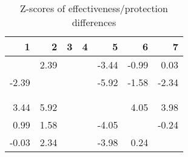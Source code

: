 \begin{table}[ht]
\centering
\begin{tabular}{rrrrrrr}
  \hline
1 & 2 & 3 & 4 & 5 & 6 & 7 \\ 
  \hline
 & 2.39 &  &  & -3.44 & -0.99 & 0.03 \\ 
  -2.39 &  &  &  & -5.92 & -1.58 & -2.34 \\ 
   &  &  &  &  &  &  \\ 
   &  &  &  &  &  &  \\ 
  3.44 & 5.92 &  &  &  & 4.05 & 3.98 \\ 
  0.99 & 1.58 &  &  & -4.05 &  & -0.24 \\ 
  -0.03 & 2.34 &  &  & -3.98 & 0.24 &  \\ 
   \hline
\end{tabular}
\caption{Z-scores of effectiveness/protection differences} 
\end{table}
